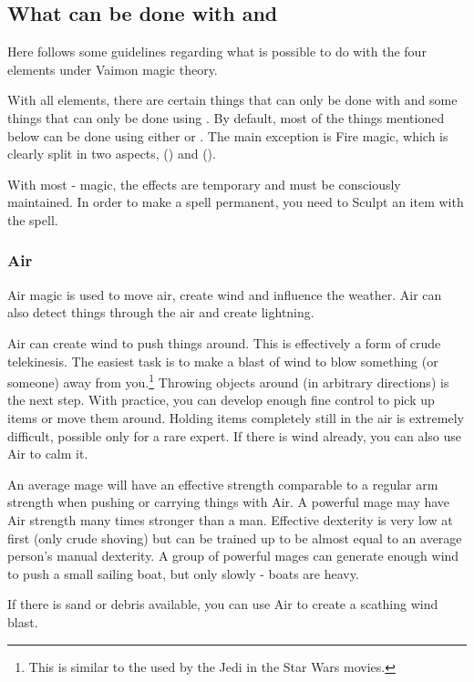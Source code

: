 \subsection{What can be done with \Iquin{} and \Itzach{}}
Here follows some guidelines regarding what is possible to do with the four elements under Vaimon magic theory. 

With all elements, there are certain things that can only be done with \Itzach{} and some things that can only be done using \Iquin{}. By default, most of the things mentioned below can be done using either \Iquin{} or \Itzach{}. The main exception is Fire magic, which is clearly split in two aspects,  (\Iquin{}) and  (\Itzach{}). 

With most \Iquin{}-\Itzach{} magic, the effects are temporary and must be consciously maintained. In order to make a spell permanent, you need to Sculpt an item with the spell. 

\subsubsection{Air}
Air magic is used to move air, create wind and influence the weather. Air can also detect things through the air and create lightning. 

Air can create wind to push things around. This is effectively a form of crude telekinesis. The easiest task is to make a blast of wind to blow something (or someone) away from you.\footnote{This is similar to the  used by the Jedi in the Star Wars movies.} Throwing objects around (in arbitrary directions) is the next step. With practice, you can develop enough fine control to pick up items or move them around. Holding items completely still in the air is extremely difficult, possible only for a rare expert. If there is wind already, you can also use Air to calm it. 

An average mage will have an effective strength comparable to a regular \humanz{} arm strength when pushing or carrying things with Air. A powerful mage may have Air strength many times stronger than a man. Effective dexterity is very low at first (only crude shoving) but can be trained up to be almost equal to an average person's manual dexterity. A group of powerful mages can generate enough wind to push a small sailing boat, but only slowly - boats are heavy. 

If there is sand or debris available, you can use Air to create a scathing wind blast. 


